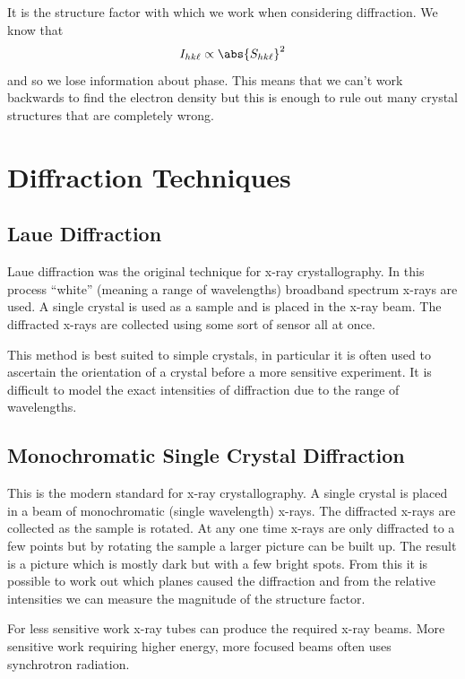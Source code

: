 \documentclass[fleqn]{NotesClass}
\begin{document}
    It is the structure factor with which we work when considering diffraction.
    We know that
    \begin{equation}
        I_{hk\ell} \propto \abs{S_{hk\ell}}^2
    \end{equation}
    and so we lose information about phase.
    This means that we can't work backwards to find the electron density but this is enough to rule out many crystal structures that are completely wrong.
    
    \section{Diffraction Techniques}
    \subsection{Laue Diffraction}
    Laue diffraction was the original technique for x-ray crystallography.
    In this process \enquote{white} (meaning a range of wavelengths) broadband spectrum x-rays are used.
    A single crystal is used as a sample and is placed in the x-ray beam.
    The diffracted x-rays are collected using some sort of sensor all at once.
    
    This method is best suited to simple crystals, in particular it is often used to ascertain the orientation of a crystal before a more sensitive experiment.
    It is difficult to model the exact intensities of diffraction due to the range of wavelengths.
    
    \subsection{Monochromatic Single Crystal Diffraction}
    This is the modern standard for x-ray crystallography.
    A single crystal is placed in a beam of monochromatic (single wavelength) x-rays.
    The diffracted x-rays are collected as the sample is rotated.
    At any one time x-rays are only diffracted to a few points but by rotating the sample a larger picture can be built up.
    The result is a picture which is mostly dark but with a few bright spots.
    From this it is possible to work out which planes caused the diffraction and from the relative intensities we can measure the magnitude of the structure factor.
    
    For less sensitive work x-ray tubes can produce the required x-ray beams.
    More sensitive work requiring higher energy, more focused beams often uses synchrotron radiation.
    
\end{document}
